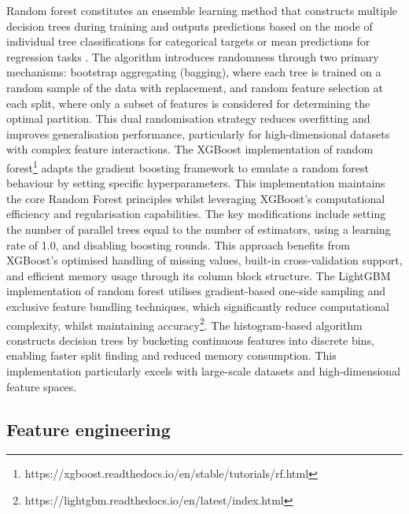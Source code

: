 Random  forest constitutes an ensemble learning method that constructs multiple decision trees during training and outputs predictions based on the mode of individual tree classifications for categorical targets or mean predictions for regression tasks \citep{Liu_2012}. The algorithm introduces randomness through two primary mechanisms: bootstrap aggregating (bagging), where each tree is trained on a random sample of the data with replacement, and random feature selection at each split, where only a subset of features is considered for determining the optimal partition. This dual randomisation strategy reduces overfitting and improves generalisation performance, particularly for high-dimensional datasets with complex feature interactions. The XGBoost implementation of random forest\footnote{https://xgboost.readthedocs.io/en/stable/tutorials/rf.html} adapts the gradient boosting framework to emulate a random forest behaviour by setting specific hyperparameters. This implementation maintains the core Random Forest principles whilst leveraging XGBoost's computational efficiency and regularisation capabilities. The key modifications include setting the number of parallel trees equal to the number of estimators, using a learning rate of 1.0, and disabling boosting rounds. This approach benefits from XGBoost's optimised handling of missing values, built-in cross-validation support, and efficient memory usage through its column block structure. The LightGBM implementation of random forest utilises gradient-based one-side sampling and exclusive feature bundling techniques, which significantly reduce computational complexity, whilst maintaining accuracy\footnote{https://lightgbm.readthedocs.io/en/latest/index.html}. The histogram-based algorithm constructs decision trees by bucketing continuous features into discrete bins, enabling faster split finding and reduced memory consumption. This implementation particularly excels with large-scale datasets and high-dimensional feature spaces.


\subsection{Feature engineering}

